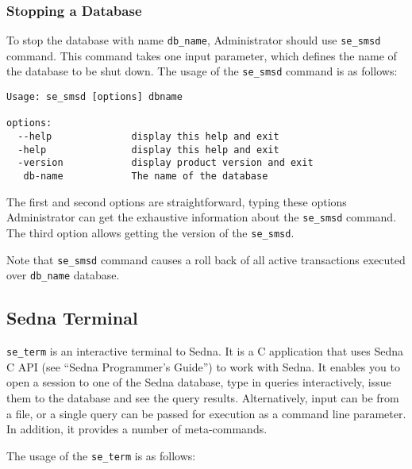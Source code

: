 \documentclass[a4paper,12pt]{article}
\begin{document}
\subsubsection{Stopping a Database}
\label{StopDB}

To stop the database with name \verb!db_name!, Administrator should use
\verb!se_smsd! command. This command takes one input parameter, which defines
the name of the database to be shut down. The usage of the \verb!se_smsd!
command is as follows:

\small{
\begin{verbatim}
Usage: se_smsd [options] dbname

options:
  --help              display this help and exit
  -help               display this help and exit
  -version            display product version and exit
   db-name            The name of the database
\end{verbatim}}

The first and second options are straightforward, typing these options
Administrator can get the exhaustive information about the \verb!se_smsd!
command. The third option allows getting the version of the \verb!se_smsd!.

Note that \verb!se_smsd! command causes a roll back of all active transactions
executed over \verb!db_name! database.


\subsection{Sedna Terminal}
\label{terminal}

\verb!se_term! is an interactive terminal to Sedna. It is a C application that
uses Sedna C API (see ``Sedna Programmer's Guide'') to work with Sedna. It
enables you to open a session to one of the Sedna database, type in queries
interactively, issue them to the database and see the query results.
Alternatively, input can be from a file, or a single query can be passed for
execution as a command line parameter. In addition, it provides a number of
meta-commands. 

The usage of the \verb!se_term! is as follows:
\end{document}
